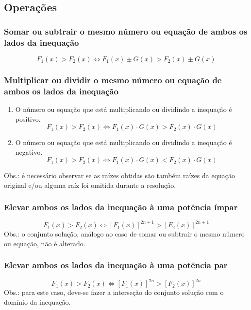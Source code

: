 \documentclass{article}
\begin{document}
\subsection{Operações}
\subsubsection{Somar ou subtrair o mesmo número ou equação de ambos os lados da inequação}
\begin{equation*}
    F_1(x)>F_2(x) \Leftrightarrow F_1(x)\pm G(x)>F_2(x)\pm G(x)
\end{equation*}

\subsubsection{Multiplicar ou dividir o mesmo número ou equação de ambos os lados da inequação}
\begin{enumerate}
    \item O número ou equação que está multiplicando ou dividindo a inequação é positivo.
        \begin{equation*}
            F_1(x)>F_2(x) \Leftrightarrow F_1(x)\cdot G(x) > F_2(x) \cdot G(x)
        \end{equation*}
        \item O número ou equação que está multiplicando ou dividindo a inequação é negativo.
        \begin{equation*}
            F_1(x)>F_2(x) \Leftrightarrow F_1(x)\cdot G(x) < F_2(x) \cdot G(x)
        \end{equation*}
\end{enumerate}
\indent \indent Obs.: é necessário observar se as raízes obtidas são também raízes da equação original e/ou alguma raíz foi omitida durante a resolução.

\subsubsection{Elevar ambos os lados da inequação à uma potência ímpar}
\begin{equation*}
    F_1(x)>F_2(x) \Leftrightarrow [F_1(x)]^{2n+1}>[F_2(x)]^{2n+1}
\end{equation*}
\indent Obs.: o conjunto solução, análogo ao caso de somar ou subtrair o mesmo número ou equação, não é alterado.

\subsubsection{Elevar ambos os lados da inequação à uma potência par}
\begin{equation*}
    F_1(x)>F_2(x) \Leftrightarrow [F_1(x)]^{2n}>[F_2(x)]^{2n}
\end{equation*}
\indent Obs.: para este caso, deve-se fazer a interseção do conjunto solução com o domínio da inequação.
\end{document}
